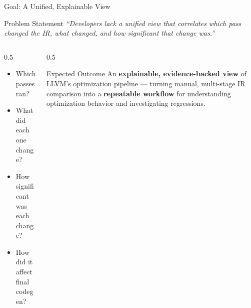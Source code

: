 \documentclass[aspectratio=169]{beamer}
\begin{document}
\begin{frame}{Goal: A Unified, Explainable View}
  \begin{block}{Problem Statement}
    \textit{``Developers lack a unified view that correlates which pass changed the IR,
    what changed, and how significant that change was.''}
  \end{block}
  \vspace{0.5em}
  \begin{columns}[T,onlytextwidth]
    \begin{column}{0.5\textwidth}
      \begin{itemize}
        \item Which passes ran?
        \item What did each one change?
        \item How significant was each change?
        \item How did it affect final codegen?
      \end{itemize}
    \end{column}
    \begin{column}{0.5\textwidth}
      \begin{alertblock}{Expected Outcome}
        An \textbf{explainable, evidence-backed view} of LLVM's
        optimization pipeline — turning manual, multi-stage IR
        comparison into a \textbf{repeatable workflow} for understanding
        optimization behavior and investigating regressions.
      \end{alertblock}
    \end{column}
  \end{columns}
\end{frame}
\end{document}
